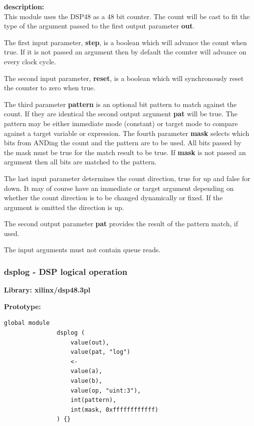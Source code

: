             {\bf description:} \\
            This module uses the DSP48 as a 48 bit counter. The count will
            be cast to fit the type of the argument passed to the first
            output parameter {\bf out}.

            The first input parameter, {\bf step}, is a boolean which will
            advance the count when true. If it is not passed an argument
            then by default the counter will advance on every clock cycle.

            The second input parameter, {\bf reset}, is a boolean which will
            synchronously reset the counter to zero when true.

            The third parameter {\bf pattern} is an optional bit pattern to
            match against the count. If they are identical the second output
            argument {\bf pat} will be true. The pattern may be either immediate
            mode (constant) or target mode to compare against a target variable
            or expression. The fourth parameter {\bf mask} selects which bits
            from ANDing the count and the pattern are to be used. All bits
            passed by the mask must be true for the match result to be true. If
            {\bf mask} is not passed an argument then all bits are matched to
            the pattern.

            The last input parameter determines the count direction, true for
            up and false for down. It may of course have an immediate or
            target argument depending on whether the count direction is to
            be changed dynamically or fixed. If the argument is omitted
            the direction is up.

            The second output parameter {\bf pat} provides the result of the
            pattern match, if used.

            The input arguments must not contain queue reads.




        \subsubsection{dsplog - DSP logical operation}\label{sec:lmdsplog}

            {\bf Library: xilinx/dsp48.3pl}

            {\bf Prototype:} \\
            \vsp
            \begin{lstlisting}[gobble=12, language=threepl]
               global module
               dsplog (
                   value(out),
                   value(pat, "log")
                   <-
                   value(a),
                   value(b),
                   value(op, "uint:3"),
                   int(pattern),
                   int(mask, 0xffffffffffff)
               ) {}
            \end{lstlisting}

